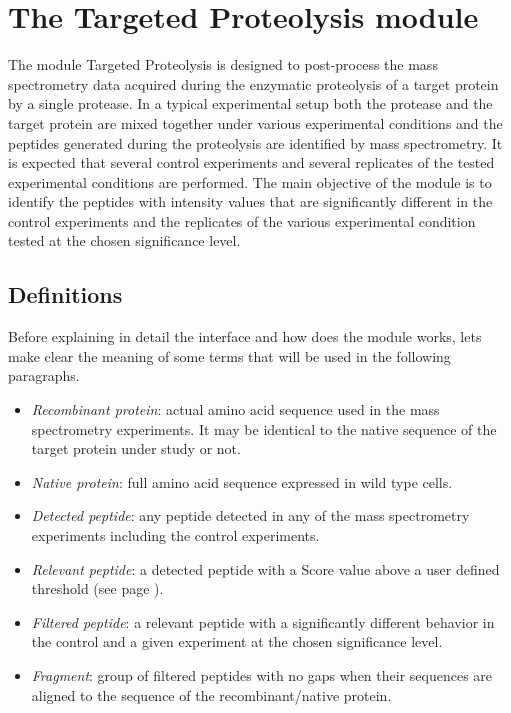 \chapter{The Targeted Proteolysis module}
\label{chap:enzdig}

The module Targeted Proteolysis is designed to post-process the mass spectrometry data acquired during the enzymatic proteolysis of a target protein by a single protease. In a typical experimental setup both the protease and the target protein are mixed together under various experimental conditions and the peptides generated during the proteolysis are identified by mass spectrometry. It is expected that several control experiments and several replicates of the tested experimental conditions are performed. The main objective of the module is to identify the peptides with intensity values that are significantly different in the control experiments and the replicates of the various experimental condition tested at the chosen significance level. 

\section{Definitions}

Before explaining in detail the interface and how does the module works, lets make clear the meaning of some terms that will be used in the following paragraphs.

\begin{itemize}
	\item \textit{Recombinant protein}: actual amino acid sequence used in the mass spectrometry experiments. It may be identical to the native sequence of the target protein under study or not.
	\item \textit{Native protein}: full amino acid sequence expressed in wild type cells.
	\item \textit{Detected peptide}: any peptide detected in any of the mass spectrometry experiments including the control experiments.
	\item \textit{Relevant peptide}: a detected peptide with a Score value above a user defined threshold (see page \pageref{par:scorevalueenzdig}).
	\item \textit{Filtered peptide}: a relevant peptide with a significantly different behavior in the control and a given experiment at the chosen significance level.\label{par:PIP}
	\item \textit{Fragment}: group of filtered peptides with no gaps when their sequences are aligned to the sequence of the recombinant/native protein. 
\end{itemize}


